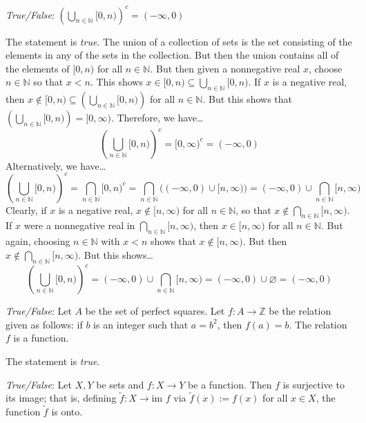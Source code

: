 \documentclass[11pt,letterpaper]{article}
\begin{document}
\newpage



\quizsol \textit{True/False}: $\displaystyle \left( \bigcup_{n \in \mathbb{N}} [0, n) \right)^c= (-\infty, 0)$ \pspace

\sol The statement is \textit{true}. The union of a collection of sets is the set consisting of the elements in any of the sets in the collection. But then the union contains all of the elements of $[0, n)$ for all $n \in \mathbb{N}$. But then given a nonnegative real $x$, choose $n \in \mathbb{N}$ so that $x < n$. This shows $x \in [0, n) \subseteq \displaystyle \bigcup_{n \in \mathbb{N}} [0, n)$. If $x$ is a negative real, then $x \notin [0, n) \subseteq \displaystyle \left( \bigcup_{n \in \mathbb{N}} [0, n) \right)$ for all $n \in \mathbb{N}$. But this shows that $\displaystyle \left( \bigcup_{n \in \mathbb{N}} [0, n) \right)= [0, \infty)$. Therefore, we have\dots
	\[
	\displaystyle \left( \bigcup_{n \in \mathbb{N}} [0, n) \right)^c= [0, \infty)^c= (-\infty, 0)
	\]
Alternatively, we have\dots
	\[
	\displaystyle \left( \bigcup_{n \in \mathbb{N}} [0, n) \right)^c= \bigcap_{n \in \mathbb{N}} [0, n)^c= \bigcap_{n \in \mathbb{N}} \bigg( (-\infty, 0) \cup [n, \infty) \bigg)= (-\infty, 0) \cup \bigcap_{n \in \mathbb{N}} [n, \infty)
	\]
Clearly, if $x$ is a negative real, $x \notin [n, \infty)$ for all $n \in \mathbb{N}$, so that $x \notin \displaystyle \bigcap_{n \in \mathbb{N}} [n, \infty)$. If $x$ were a nonnegative real in $\displaystyle \bigcap_{n \in \mathbb{N}} [n, \infty)$, then $x \in [n, \infty)$ for all $n \in \mathbb{N}$. But again, choosing $n \in \mathbb{N}$ with $x < n$ shows that $x \notin [n, \infty)$. But then $x \notin \displaystyle \bigcap_{n \in \mathbb{N}} [n, \infty)$. But this shows\dots 
	\[
	\displaystyle \left( \bigcup_{n \in \mathbb{N}} [0, n) \right)^c= (-\infty, 0) \cup \bigcap_{n \in \mathbb{N}} [n, \infty)= (-\infty, 0) \cup \varnothing= (-\infty, 0)
	\]








\quizsol \textit{True/False}: Let $A$ be the set of perfect squares. Let $f: A \to \mathbb{Z}$ be the relation given as follows: if $b$ is an integer such that $a= b^2$, then $f(a)= b$. The relation $f$ is a function. 

\sol The statement is \textit{true}. 



\quizsol \textit{True/False}: Let $X, Y$ be sets and $f: X \to Y$ be a function. Then $f$ is surjective to its image; that is, defining $\widetilde{f}: X \to \text{im } f$ via $\widetilde{f}(x):= f(x)$ for all $x \in X$, the function $\widetilde{f}$ is onto. \pspace
\end{document}
